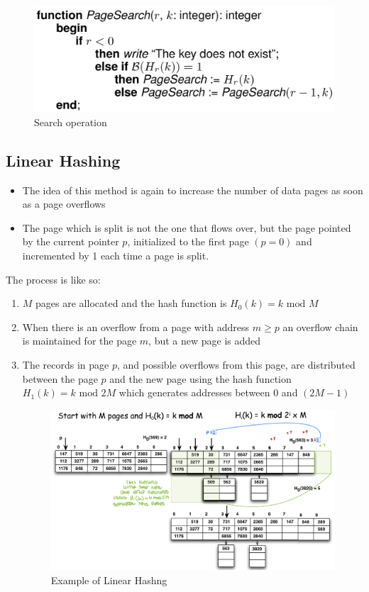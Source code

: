 \begin{figure}[!h]
    \centering
    \includegraphics[width=0.5\linewidth]{images/DBMS_Internals/HashingOrganization/search_operation.jpeg}
    \caption{Search operation}
\end{figure}






\subsection{Linear Hashing}
\begin{itemize}
    \item The idea of this method is again to increase the number of data pages as soon as a page overflows
    \item The page which is split is not the one that flows over, but the page pointed by the current pointer \(p\), initialized to the first page \((p = 0)\) and incremented by 1 each time a page is split.
\end{itemize}
The process is like so:
\begin{enumerate}
    \item \(M\) pages are allocated and the hash function is \(H_0(k) = k \text{ mod } M\)
    \item When there is an overflow from a page with address \(m \geq p\) an overflow chain is maintained for the page \(m\), but a new page is added
    \item The records in page \(p\), and possible overflows from this page, are distributed between the page \(p\) and the new page using the hash function \(H_1(k) = k \text{ mod } 2M\) which generates addresses between \(0\) and \((2M - 1)\) 
    \begin{figure}[!h]
    \centering
    \includegraphics[width=0.8\linewidth]{images/DBMS_Internals/HashingOrganization/linear_hashing.jpeg}
    \caption{Example of Linear Hashng}
\end{figure}

\end{enumerate}
